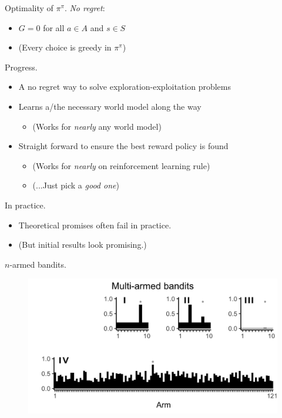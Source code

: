 \documentclass[10pt]{beamer}
\begin{document}
\begin{frame}[fragile]{Optimality of $\pi^\pi$.}
\textit{No regret}:
\begin{itemize}
\item $G = 0$ for all $a \in A$ and $s \in S$
\item (Every choice is greedy in $\pi^{\pi}$)
\end{itemize}
\end{frame}

\begin{frame}[fragile]{Progress.}
\begin{itemize}
\item A no regret way to solve exploration-exploitation problems
\item Learns a/the necessary world model along the way
\begin{itemize}
    \item (Works for \textit{nearly} any world model)
\end{itemize}
\item Straight forward to ensure the best reward policy is found
\begin{itemize}
    \item (Works for \textit{nearly} on reinforcement learning rule)
    \item (...Just pick a \textit{good one})
\end{itemize}
\end{itemize}
\end{frame}

\begin{frame}[fragile]{In practice.}
\begin{itemize}
    \item \alert{Theoretical promises often fail in practice.}
    \item (But initial results look promising.)
\end{itemize}
\end{frame}

\begin{frame}[fragile]{$n$-armed bandits.}
\begin{figure}
    \centering
    \includegraphics[scale=0.2]{images/fig2.png}
    \caption{}
\end{figure}
\end{frame}
\end{document}
